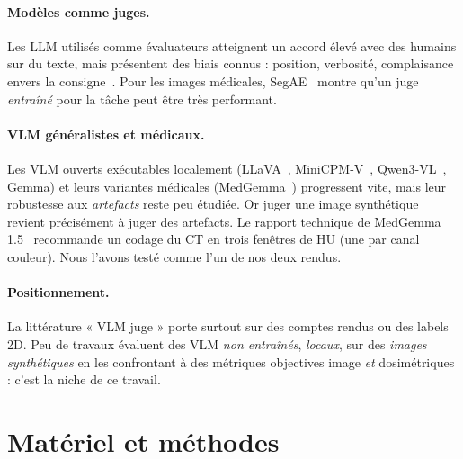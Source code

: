 \documentclass[11pt,a4paper]{article}
\begin{document}
\paragraph{Modèles comme juges.} Les LLM utilisés comme évaluateurs atteignent un accord élevé avec des humains sur du texte, mais présentent des biais connus : position, verbosité, complaisance envers la consigne~\cite{zheng2023judging}. Pour les images médicales, SegAE~\cite{chen2026segae} montre qu'un juge \emph{entraîné} pour la tâche peut être très performant.

\paragraph{VLM généralistes et médicaux.} Les VLM ouverts exécutables localement (LLaVA~\cite{liu2023llava}, MiniCPM-V~\cite{yao2024minicpmv}, Qwen3-VL~\cite{qwen3vl}, Gemma) et leurs variantes médicales (MedGemma~\cite{sellergren2025medgemma}) progressent vite, mais leur robustesse aux \emph{artefacts} reste peu étudiée. Or juger une image synthétique revient précisément à juger des artefacts. Le rapport technique de MedGemma 1.5~\cite{medgemma15} recommande un codage du CT en trois fenêtres de HU (une par canal couleur). Nous l'avons testé comme l'un de nos deux rendus.

\paragraph{Positionnement.} La littérature « VLM juge » porte surtout sur des comptes rendus ou des labels 2D. Peu de travaux évaluent des VLM \emph{non entraînés}, \emph{locaux}, sur des \emph{images synthétiques} en les confrontant à des métriques objectives image \emph{et} dosimétriques : c'est la niche de ce travail.

\section{Matériel et méthodes}
\label{sec:methodes}
\end{document}
